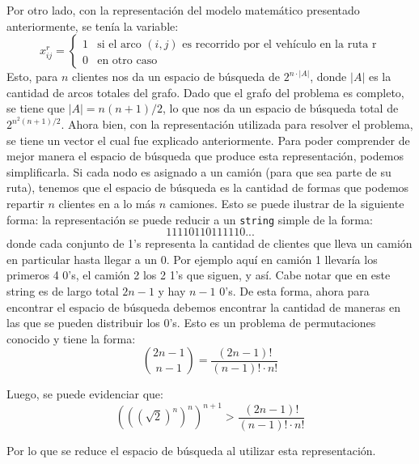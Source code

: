 \documentclass{article}
\begin{document}
Por otro lado, con la representación del modelo matemático presentado anteriormente, se tenía la variable:
\begin{equation*}
    x^r_{ij}= 
    \begin{cases}
        1 & \text{si el arco $(i,j)$ es recorrido por el vehículo en la ruta r}\\
        0 & \text{en otro caso}
    \end{cases}
\end{equation*}
Esto, para $n$ clientes nos da un espacio de búsqueda de $2^{n \cdot |A|}$, donde $|A|$ es la cantidad de arcos totales del grafo. Dado que el grafo del problema es completo, se tiene que $|A| = n(n+1)/2$, lo que nos da un espacio de búsqueda total de $2^{n^2(n+1)/2}$. Ahora bien, con la representación utilizada para resolver el problema, se tiene un vector el cual fue explicado anteriormente. Para poder comprender de mejor manera el espacio de búsqueda que produce esta representación, podemos simplificarla. Si cada nodo es asignado a un camión (para que sea parte de su ruta), tenemos que el espacio de búsqueda es la cantidad de formas que podemos repartir $n$ clientes en a lo más $n$ camiones. Esto se puede ilustrar de la siguiente forma: la representación se puede reducir a un \texttt{string} simple de la forma: $$11110110111110...$$ donde cada conjunto de 1's representa la cantidad de clientes que lleva un camión en particular hasta llegar a un 0. Por ejemplo aquí en camión 1 llevaría los primeros 4 0's, el camión 2 los 2 1's que siguen, y así. Cabe notar que en este string es de largo total $2n-1$ y hay $n-1$ 0's. De esta forma, ahora para encontrar el espacio de búsqueda debemos encontrar la cantidad de maneras en las que se pueden distribuir los 0's. Esto es un problema de permutaciones conocido y tiene la forma: 
\begin{equation*}
    \binom{2n-1}{n-1} = \frac{(2n-1)!}{(n-1)!\cdot n!}
\end{equation*}

Luego, se puede evidenciar que:
\begin{equation*}
    \left(\left(\left(\sqrt{2}\right)^n\right)^n\right)^{n+1} > \frac{(2n-1)!}{(n-1)!\cdot n!}
\end{equation*}

Por lo que se reduce el espacio de búsqueda al utilizar esta representación. 
\newpage
\end{document}
